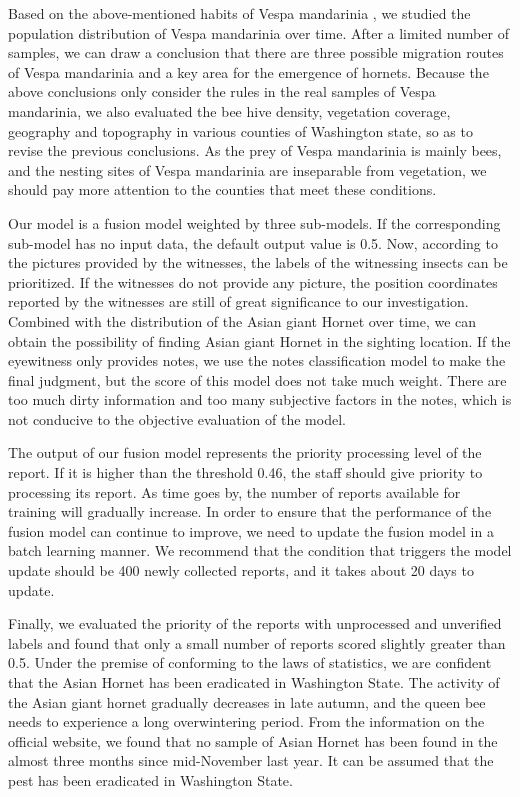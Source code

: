 \documentclass{mcmthesis}
\numberwithin{figure}{section}
\numberwithin{table}{section}
\begin{document}
Based on the above-mentioned habits of Vespa mandarinia , we studied the population distribution of Vespa mandarinia  over time. After a limited number of samples, we can draw a conclusion that there are three possible migration routes of Vespa mandarinia  and a key area for the emergence of hornets. Because the above conclusions only consider the rules in the real samples of Vespa mandarinia, we also evaluated the bee hive density, vegetation coverage, geography and topography in various counties of Washington state, so as to revise the previous conclusions. As the prey of Vespa mandarinia is mainly bees, and the nesting sites of Vespa mandarinia  are inseparable from vegetation, we should pay more attention to the counties that meet these conditions.

Our model is a fusion model weighted by three sub-models. If the corresponding sub-model has no input data, the default output value is 0.5. Now, according to the pictures provided by the witnesses, the labels of the witnessing insects can be prioritized. If the witnesses do not provide any picture, the position coordinates reported by the witnesses are still of great significance to our investigation. Combined with the distribution of the Asian giant Hornet over time, we can obtain the possibility of finding Asian giant Hornet in the sighting location. If the eyewitness only provides notes, we use the notes classification model to make the final judgment, but the score of this model does not take much weight. There are too much dirty information and too many subjective factors in the notes, which is not conducive to the objective evaluation of the model.

The output of our fusion model represents the priority processing level of the report. If it is higher than the threshold 0.46, the staff should give priority to processing its report. As time goes by, the number of reports available for training will gradually increase. In order to ensure that the performance of the fusion model can continue to improve, we need to update the fusion model in a batch learning manner. We recommend that the condition that triggers the model update should be 400 newly collected reports, and it takes about 20 days to update.

Finally, we evaluated the priority of the reports with unprocessed and unverified labels and found that only a small number of reports scored slightly greater than 0.5. Under the premise of conforming to the laws of statistics, we are confident that the Asian Hornet has been eradicated in Washington State. The activity of the Asian giant hornet gradually decreases in late autumn, and the queen bee needs to experience a long overwintering period. From the information on the official website, we found that no sample of Asian Hornet has been found in the almost three months since mid-November last year. It can be assumed that the pest has been eradicated in Washington State.
\end{document}
